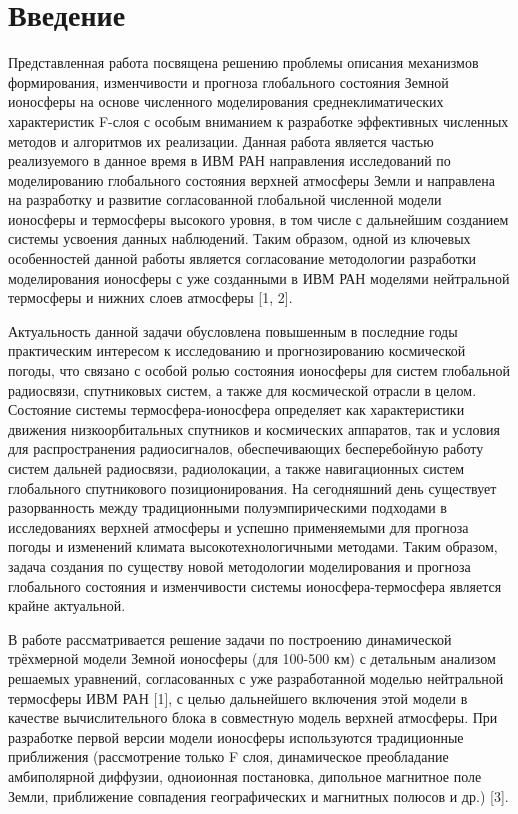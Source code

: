\documentclass[14pt, a4paper, fleqn]{extarticle}
\begin{document}
\tableofcontents
\clearpage

\section{Введение}
Представленная работа посвящена решению проблемы описания механизмов формирования, изменчивости и прогноза глобального состояния Земной ионосферы на основе численного моделирования среднеклиматических характеристик F-слоя с особым вниманием к разработке эффективных численных методов и алгоритмов их реализации. Данная работа является частью реализуемого в данное время в ИВМ РАН направления исследований по моделированию глобального состояния верхней атмосферы Земли и направлена на разработку и развитие согласованной глобальной численной модели ионосферы и термосферы высокого уровня, в том числе с дальнейшим созданием системы усвоения данных наблюдений. Таким образом, одной из ключевых особенностей данной работы является согласование методологии разработки моделирования ионосферы с уже созданными в ИВМ РАН моделями нейтральной термосферы и нижних слоев атмосферы [1, 2].

Актуальность данной задачи обусловлена повышенным в последние годы практическим интересом к исследованию и прогнозированию космической погоды, что связано с особой ролью состояния ионосферы для систем глобальной радиосвязи, спутниковых систем, а также для космической отрасли в целом. Состояние системы термосфера-ионосфера определяет как характеристики движения низкоорбитальных спутников и космических аппаратов, так и условия для распространения радиосигналов, обеспечивающих бесперебойную работу систем дальней радиосвязи, радиолокации, а также навигационных систем глобального спутникового позиционирования. На сегодняшний день существует разорванность между традиционными полуэмпирическими подходами в исследованиях верхней атмосферы и успешно применяемыми для прогноза погоды и изменений климата высокотехнологичными методами. Таким образом, задача создания по существу новой методологии моделирования и прогноза глобального состояния и изменчивости системы ионосфера-термосфера является крайне актуальной.

В работе рассматривается решение задачи по построению динамической трёхмерной модели Земной ионосферы (для 100-500 км) с детальным анализом решаемых уравнений, согласованных с уже разработанной моделью нейтральной термосферы ИВМ РАН [1], с целью дальнейшего включения этой модели в качестве вычислительного блока в совместную модель верхней атмосферы. При разработке первой версии модели ионосферы используются традиционные приближения (рассмотрение только F слоя, динамическое преобладание амбиполярной диффузии, одноионная постановка, дипольное магнитное поле Земли, приближение совпадения географических и магнитных полюсов и др.) [3]. 
\end{document}
